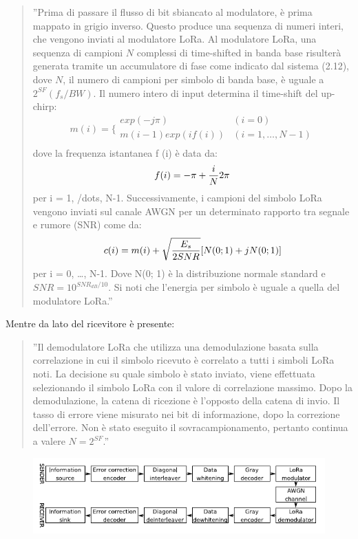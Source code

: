 \documentclass[a4paper]{report} %
\begin{document}
\begin{enumerate}
\begin{quote}	
	''Prima di passare il flusso di bit sbiancato al modulatore, è prima mappato in grigio inverso. Questo produce una sequenza di numeri interi, che vengono inviati al modulatore LoRa. Al modulatore LoRa, una sequenza di campioni $N$ complessi di time-shifted in banda base risulterà generata tramite un accumulatore di fase come indicato dal sistema (2.12), dove $N$, il numero di campioni per simbolo di banda base, è uguale a $2^{SF} (f_s / BW)$. Il numero intero di input determina il time-shift del up-chirp:
	\begin{equation}
	m(i) = \bigg \{
	\begin{array}{rl}
	exp(-j\pi) & (i = 0)\\
	m(i-1)exp(if(i)) & (i = 1, \dots, N-1)\\
	\end{array}
	\end{equation}
	dove la frequenza istantanea f (i) è data da:
	\begin{equation}
	f(i) = -\pi + {i \over N} 2\pi  
	\end{equation}
	per i = 1, /dots, N-1. Successivamente, i campioni del simbolo LoRa vengono inviati sul canale AWGN per un determinato rapporto tra segnale e rumore (SNR) come da:
	\begin{equation}
	c(i) = m(i) + \sqrt{E_s \over 2SNR}[N(0; 1) + jN(0; 1)]
	\end{equation}
	per i = 0, \dots, N-1. Dove N(0; 1) è la distribuzione normale standard e $SNR = 10^{SNR_{dB} / 10}$. Si noti che l'energia per simbolo è uguale a quella del modulatore LoRa.''
\end{quote}
Mentre da lato del ricevitore è presente:
\begin{quote}
	''Il demodulatore LoRa che utilizza una demodulazione basata sulla correlazione in cui il simbolo ricevuto è correlato a tutti i simboli LoRa noti. La decisione su quale simbolo è stato inviato, viene effettuata selezionando il simbolo LoRa con il valore di correlazione massimo. Dopo la demodulazione, la catena di ricezione è l'opposto della catena di invio. Il tasso di errore viene misurato nei bit di informazione, dopo la correzione dell'errore. Non è stato eseguito il sovracampionamento, pertanto continua a valere $N = 2^{SF}$.''
\end{quote}

\begin{figure}
\centering
\includegraphics[scale=.7]{Immagini/SchemaABlocchi.png}


\end{figure}
\end{enumerate}
\end{document}
